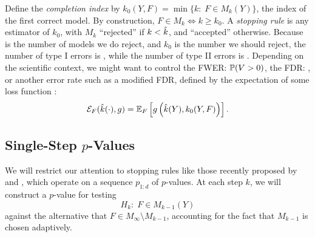 \documentclass{article}
\begin{document}
Define the {\em completion index} by $k_0(Y, F) = \min\{k:\; F \in M_k(Y)\}$, the index of the first correct model. By construction, $F\in M_k \iff k \geq k_0$. A {\em stopping rule} is any estimator \smash{$\hk$} of $k_0$, with $M_k$ ``rejected'' if $k < \hk$, and ``accepted'' otherwise. Because \smash{$\hk$} is the number of models we do reject, and $k_0$ is the number we should reject, the number of type I errors is , while the number of type II errors is . Depending on the scientific context, we might want to control the FWER: $\P(V>0)$, the FDR: \smash{$\E[V/\hk; \hk>0]$}, or another error rate such as a modified FDR, defined by the expectation of some loss function :
\begin{equation}\label{eq:errRate}
\Err_F(\hk(\cdot), g) = \E_F\left[ g\left(\hk(Y), k_0(Y, F)\right)\right].
\end{equation}

\subsection{Single-Step $p$-Values}\label{sec:singleStep}

We will restrict our attention to stopping rules like those recently proposed by \citet{gsell2013sequential} and \citet{li2015accumulation}, which operate on a sequence $p_{1:d}$ of $p$-values. At each step $k$, we will construct a $p$-value for testing
\[
H_{k}:\; F\in M_{k-1}(Y)
\]
against the alternative that $F\in M_\infty\setminus M_{k-1}$, accounting for the fact that $M_{k-1}$ is chosen adaptively.
\end{document}
